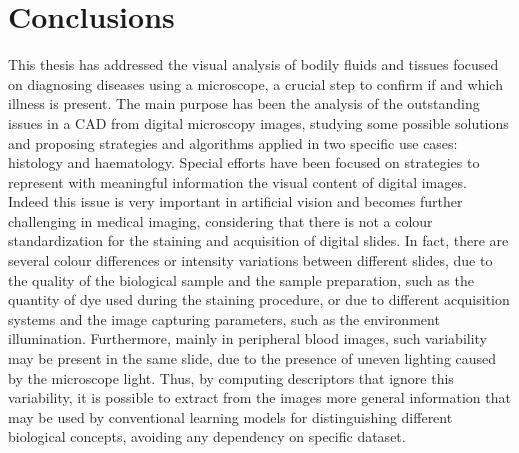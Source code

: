 \documentclass[final,a4paper,12pt,english]{UnicaPhdThesis3}
\begin{document}
	\chapter*{Conclusions} \label{quattro}
	This thesis has addressed the visual analysis of bodily fluids and tissues focused on diagnosing diseases using a microscope, a crucial step to confirm if and which illness is present. The main purpose has been the analysis of the outstanding issues in a CAD from digital microscopy images, studying some possible solutions and proposing strategies and algorithms applied in two specific use cases: histology and haematology. Special efforts have been focused on strategies to represent with meaningful information the visual content of digital images. Indeed this issue is very important in artificial vision and becomes further challenging in medical imaging, considering that there is not a colour standardization for the staining and acquisition of digital slides. In fact, there are several colour differences or intensity variations between different slides, due to the quality of the biological sample and the sample preparation, such as the quantity of dye used during the staining procedure, or due to different acquisition systems and the image capturing parameters, such as the environment illumination. Furthermore, mainly in peripheral blood images, such variability may be present in the same slide, due to the presence of uneven lighting caused by the microscope light. Thus, by computing descriptors that ignore this variability, it is possible to extract from the images more general information that may be used by conventional learning models for distinguishing different biological concepts, avoiding any dependency on specific dataset. 
	
\end{document}
